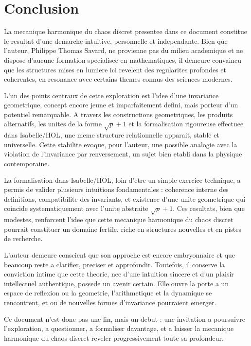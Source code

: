 \documentclass[12pt,a4paper]{article}
\theoremstyle{definition}
\theoremstyle{remark}
\begin{document}
\section{Conclusion}

La mecanique harmonique du chaos discret presentee dans ce document constitue
le resultat d'une demarche intuitive, personnelle et independante. Bien que
l'auteur, Philippe Thomas Savard, ne provienne pas du milieu academique et ne
dispose d'aucune formation specialisee en mathematiques, il demeure convaincu
que les structures mises en lumiere ici revelent des regularites profondes et
coherentes, en resonance avec certains themes connus des sciences modernes.

L'un des points centraux de cette exploration est l'idee d'une invariance
geometrique, concept encore jeune et imparfaitement defini, mais porteur
d'un potentiel remarquable. A travers les constructions geometriques, les
produits alternatifs, les unites de la forme $\sqrt{p} + 1$ et la formalisation
rigoureuse effectuee dans Isabelle/HOL, une meme structure relationnelle
apparait, stable et universelle. Cette stabilite evoque, pour l'auteur, une
possible analogie avec la violation de l'invariance par renversement, un sujet
bien etabli dans la physique contemporaine.

La formalisation dans Isabelle/HOL, loin d'etre un simple exercice technique,
a permis de valider plusieurs intuitions fondamentales : coherence interne des
definitions, compatibilite des invariants, et existence d'une unite geometrique
qui coincide systematiquement avec l'unite abstraite $\sqrt{p} + 1$. Ces
resultats, bien que modestes, renforcent l'idee que cette mecanique harmonique
du chaos discret pourrait constituer un domaine fertile, riche en structures
nouvelles et en pistes de recherche.

L'auteur demeure conscient que son approche est encore embryonnaire et que
beaucoup reste a clarifier, preciser et approfondir. Toutefois, il conserve la
conviction intime que cette theorie, nee d'une intuition sincere et d'un
plaisir intellectuel authentique, possede un avenir certain. Elle ouvre la
porte a un espace de reflexion ou la geometrie, l'arithmetique et la dynamique
se rencontrent, et ou de nouvelles formes d'invariance pourraient emerger.

Ce document n'est donc pas une fin, mais un debut : une invitation a poursuivre
l'exploration, a questionner, a formaliser davantage, et a laisser la mecanique
harmonique du chaos discret reveler progressivement toute sa profondeur.
\end{document}

